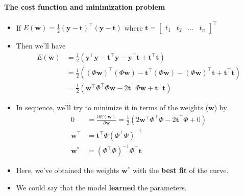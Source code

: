 \begin{frame}{\insertsubsection}
	\framesubtitle{The cost function and minimization problem}
	\begin{itemize}
		\item If $E(\mathbf{w}) = \frac{1}{2} \left( \mathbf{y} - \mathbf{t} \right)^{\top}\left( \mathbf{y} - \mathbf{t} \right)$ where $\mathbf{t} = \begin{bmatrix} t_1 & t_2 & ... & t_n
		\end{bmatrix}^{\top}$
		\item Then we'll have 
		\begin{align*}
			E(\mathbf{w}) &= \frac{1}{2} \left( \mathbf{y}^{\top}\mathbf{y} -  \mathbf{t}^{\top}\mathbf{y} - \mathbf{y}^{\top}\mathbf{t} + \mathbf{t}^{\top}\mathbf{t} \right) \\
					   &= \frac{1}{2} \left( ( \Phi \mathbf{w})^{\top}( \Phi \mathbf{w}) -  \mathbf{t}^{\top}( \Phi \mathbf{w}) - ( \Phi \mathbf{w})^{\top}\mathbf{t} + \mathbf{t}^{\top}\mathbf{t} \right) \\
					   &= \frac{1}{2} \left( \mathbf{w}^{\top} \Phi^{\top} \Phi \mathbf{w} -  2\mathbf{t}^{\top} \Phi \mathbf{w} + \mathbf{t}^{\top}\mathbf{t} \right)
		\end{align*}
		\item In sequence, we'll try to minimize it in terms of the weights ($\mathbf{w}$) by
			\begin{align*}
				0 &= \frac{\partial E(\mathbf{w})}{\partial \mathbf{w}} = \frac{1}{2} \left( 2 \mathbf{w}^{\top} \Phi^{\top} \Phi  -  2\mathbf{t}^{\top} \Phi + 0 \right) \\
				\mathbf{w}^{\top} &=  \mathbf{t}^{\top} \Phi \left( \Phi^{\top} \Phi \right)^{-1} \\
				\mathbf{w}^* &= \left( \Phi^{\top} \Phi \right)^{-1}\Phi^{\top} \mathbf{t}
			\end{align*}
		\item Here, we've obtained the weights $\mathbf{w}^*$ with the \textcolor{UniOrange}{\textbf{best fit}} of the curve.
		\item We could say that the model \textcolor{UniOrange}{\textbf{learned}} the parameters.
	\end{itemize}
\end{frame}

%

